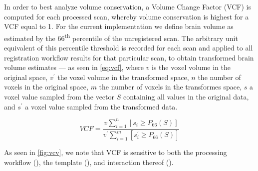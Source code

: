 In order to best analyze volume conservation, a Volume Change Factor (VCF) is computed for each processed scan, whereby volume conservation is highest for a VCF equal to 1.
For the current implementation we define brain volume as estimated by the 66\textsuperscript{th} percentile of the unregistered scan.
The arbitrary unit equivalent of this percentile threshold is recorded for each scan and applied to all registration workflow results for that particular scan, to obtain transformed brain volume estimates
 --- as seen in \cref{eq:vcf}, where $v$ is the voxel volume in the original space, $v^\prime$ the voxel volume in the transformed space, $n$ the number of voxels in the original space, $m$ the number of voxels in the transformes space, $s$ a voxel value sampled from the vector $S$ containing all values in the original data, and $s^\prime$ a voxel value sampled from the transformed data.

\begin{equation} \label{eq:vcf}
        VCF = \frac{v\sum_{i=1}^n [s_i \geq P_{66}(S)]}{v^\prime\sum_{i=1}^m [s^\prime_i \geq P_{66}(S)]}
\end{equation}


\begin{sansmath}
\end{sansmath}

As seen in \cref{fig:vcv}, we note that VCF is sensitive to both
the processing workflow (),
the template (),
and interaction thereof ().

